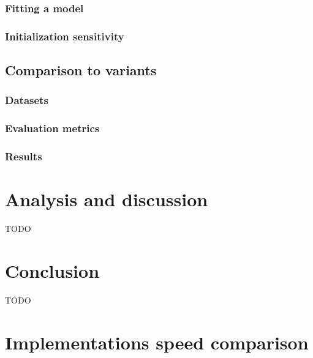 \documentclass[10pt]{article}
\begin{document}
\subsubsection{Fitting a model}

\subsubsection{Initialization sensitivity}


\subsection{Comparison to variants}

\subsubsection{Datasets}

\subsubsection{Evaluation metrics}

\subsubsection{Results}


\section{Analysis and discussion}
\label{sec:discussion}

TODO



\section{Conclusion}
\label{sec:conclusion}

TODO




\newpage

\appendix
\section{Implementations speed comparison}
    \label{app:speed_comparison}
\end{document}
